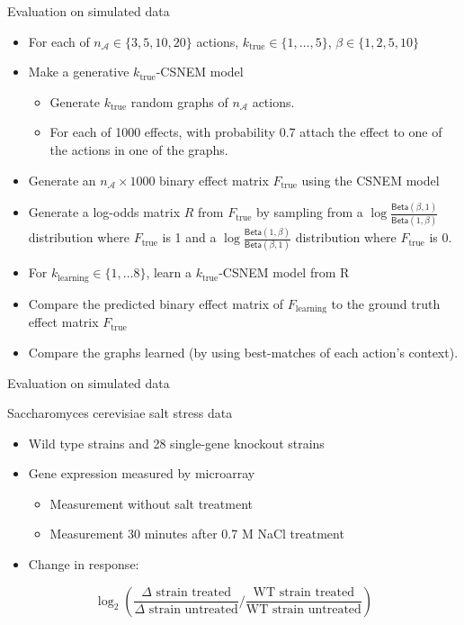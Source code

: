 \documentclass[aspectratio=169]{beamer}
\begin{document}
\begin{frame}{Evaluation on simulated data}
\begin{itemize}[<+->]
 \item \small For each of $n_\mathcal{A} \in \{3,5,10,20\}$ actions, $k_\text{true} \in \{1,\ldots, 5\}$, $\beta \in \{1, 2, 5, 10 \}$
 \item Make a generative $k_\text{true}$-CSNEM model
 \begin{itemize}
  \item Generate $k_\text{true}$ random graphs of $n_\mathcal{A}$ actions.
  \item For each of 1000 effects, with probability 0.7 attach the effect to one of the actions in one of the graphs.
 \end{itemize}
 \item Generate an $n_\mathcal{A} \times 1000$ binary effect matrix $F_\text{true}$ using the CSNEM model
 \item Generate a log-odds matrix $R$ from $F_\text{true}$ by sampling from a $\log \frac{ \mathsf{Beta}(\beta,1) }{ \mathsf{Beta}(1,\beta) }$ distribution where $F_\text{true}$ is 1 and a $\log \frac{ \mathsf{Beta}(1,\beta) }{ \mathsf{Beta}(\beta,1) }$ distribution where $F_\text{true}$ is 0.
 \item For $k_\text{learning} \in \{ 1, \ldots 8 \}$, learn a $k_\text{true}$-CSNEM model from R
 \item Compare the predicted binary effect matrix of $F_\text{learning}$ to the ground truth effect matrix $F_\text{true}$
 \item Compare the graphs learned (by using best-matches of each action's context).
\end{itemize}
\end{frame}


\begin{frame}{Evaluation on simulated data}
\end{frame}


\begin{frame}{Saccharomyces cerevisiae salt stress data}
\begin{itemize}
 \item Wild type strains and 28 single-gene knockout strains
 \item Gene expression measured by microarray
  \begin{itemize}
   \item \normalsize Measurement without salt treatment
   \item \normalsize Measurement 30 minutes after 0.7 M NaCl treatment
  \end{itemize}
 \item Change in response:
\end{itemize}
\[
 \log_2 \left( \frac{\Delta \text{ strain treated}}{\Delta \text{ strain untreated}} \bigg/ \frac{\text{WT strain treated}}{\text{WT strain untreated}} \right)
\]
\vfill
{\tiny {} \\  \\}
\end{frame}
\end{document}
